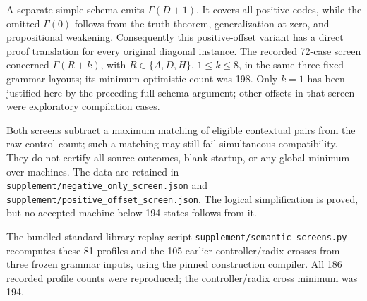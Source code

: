 A separate simple schema emits $\Gamma(D+1)$. It covers all positive
codes, while the omitted $\Gamma(0)$ follows from the truth theorem,
generalization at zero, and propositional weakening. Consequently this
positive-offset variant has a direct proof translation for every
original diagonal instance. The recorded 72-case screen concerned
$\Gamma(R+k)$, with $R\in\{A,D,H\}$, $1\le k\le8$, in the same three
fixed grammar layouts; its minimum optimistic count was 198. Only
$k=1$ has been justified here by the preceding full-schema argument;
other offsets in that screen were exploratory compilation cases.

Both screens subtract a maximum matching of eligible contextual pairs
from the raw control count; such a matching may still fail simultaneous
compatibility. They do not certify all source outcomes, blank startup,
or any global minimum over machines. The data are retained in
\texttt{supplement/negative\_only\_screen.json} and
\texttt{supplement/positive\_offset\_screen.json}. The logical simplification
is proved, but no accepted machine below 194 states follows from it.

The bundled standard-library replay script
\texttt{supplement/semantic\_screens.py} recomputes these 81 profiles and
the 105 earlier controller/radix crosses from three frozen grammar inputs,
using the pinned construction compiler. All 186 recorded profile counts
were reproduced; the controller/radix cross minimum was 194.
